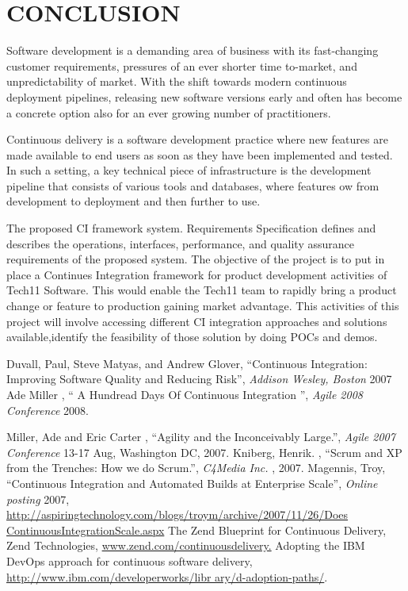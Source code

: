 \documentclass[12pt,a4paper,oneside]{report}
\newcommand{\quotes}[1]{``#1''}
\begin{document}
{\chapter{CONCLUSION}
\par 
Software development is a demanding area of business with its
fast-changing customer requirements, pressures of an ever shorter time to-market, and unpredictability
of market. With the shift towards modern continuous deployment pipelines, releasing
new software versions early and often has become a concrete option also for an ever
growing number of practitioners. \par Continuous delivery is a software development practice where new features are made
available to end users as soon as they have been implemented and tested. In such a setting, a
key technical piece of infrastructure is the development pipeline that consists of various tools
and databases, where features ow from development to deployment and then further to use.
\par
The proposed CI framework system. Requirements Specification defines and describes the operations, interfaces,
performance, and quality assurance requirements of the proposed system. 
The objective of the project is to put in place a Continues Integration framework for
product development activities of Tech11 Software. This would enable the Tech11 team to
rapidly bring a product change or feature to production gaining market advantage. This activities
of this project will involve accessing different CI integration approaches and solutions
available,identify the feasibility of those solution by doing POCs and demos.

\renewcommand{\bibname}{\uppercase{REFERENCES}}
\begin{thebibliography}{999}
\raggedright
{} Duvall, Paul, Steve Matyas, and Andrew
Glover, \quotes{Continuous Integration: Improving Software Quality and Reducing Risk}, \textit{ Addison Wesley, Boston} 2007
Ade Miller , \quotes{ A Hundread Days Of Continuous Integration }, \textit{ Agile 2008 Conference} 2008.

Miller, Ade and Eric Carter , \quotes{Agility and the
Inconceivably Large.}, \textit{ Agile 2007 Conference} 
13-17 Aug,
Washington DC, 2007. 
Kniberg, Henrik. , \quotes{Scrum and XP from the
Trenches: How we do Scrum.}, \textit{  C4Media Inc.} 
, 2007. 
 Magennis, Troy, \quotes{Continuous Integration and Automated Builds at Enterprise Scale}, \textit{ Online posting} 2007, \hspace{2pt}  \url{ http://aspiringtechnology.com/blogs/troym/archive/2007/11/26/Does ContinuousIntegrationScale.aspx}
The Zend Blueprint for Continuous Delivery, Zend Technologies, \url{www.zend.com/continuousdelivery.}
 Adopting the IBM DevOps approach for
continuous software delivery, \hspace{2pt}
 \url{http://www.ibm.com/developerworks/libr
ary/d-adoption-paths/}.


\end{thebibliography}}
\end{document}
